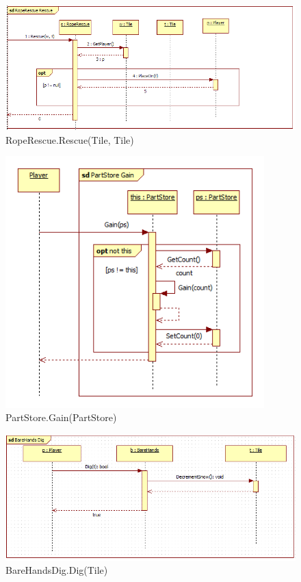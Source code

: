 \begin{figure}[H]
	\begin{center}
		\includegraphics[width=13cm]{chapters/chapter03/seqdiag/RopeRescue_Rescue.png}
		\caption{RopeRescue.Rescue(Tile, Tile)}
		\label{fig:RopeRescueRescue}
	\end{center}
\end{figure}
\begin{figure}[H]
	\begin{center}
		\includegraphics[width=10cm]{chapters/chapter03/seqdiag/PartStore_Gain.png}
		\caption{PartStore.Gain(PartStore)}
		\label{fig:PartStoreGain}
	\end{center}
\end{figure}
\begin{figure}[H]
	\begin{center}
		\includegraphics[width=15cm]{chapters/chapter03/seqdiag/BareHandsDig_Dig.png}
		\caption{BareHandsDig.Dig(Tile)}
		\label{fig:BareHandsDig.Dig}
	\end{center}
\end{figure}
